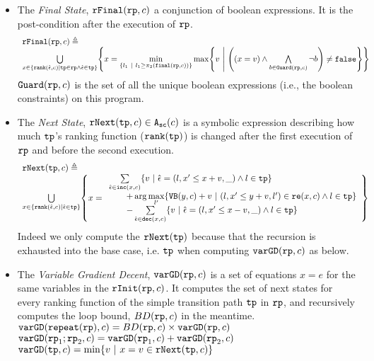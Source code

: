 \begin{defn}
\begin{itemize}
 \item  The \emph{Final State}, $\mathtt{rFinal}(\mathtt{rp}, c)$ a conjunction of boolean expressions.
 It is the post-condition
 after the execution of $\mathtt{rp}$.
 \[
  \begin{array}{l} 
    \rffinal(\rprog, c) \triangleq 
    \\
   \bigcup\limits_{x \in \left\{ \locbound(\absevent, c) | \tpath \in \rprog \land \absevent \in \tpath \right\} }
   \left \{ 
   x = \min\limits_{ \left\{ l_1 ~|~ l_1 \geq \pi_2(\absfinal(\rprog, c)) \right\} }
   \max\left\{
     v ~\middle\vert~ 
     \left( (x = v) \land \bigwedge\limits_{b \in \kw{Guard}(\rprog, c)} \neg b \right) \neq \efalse
   \right\}
   \right\}
  \end{array}
  \]
  $\mathtt{Guard}(\mathtt{rp}, c)$ is the set of all the unique boolean expressions (i.e., the boolean constraints) on this program.
 \item The \emph{Next State}, $\mathtt{rNext}(\mathtt{tp}, c) \in {\ensuremath{\mathtt{A_{sc}}}}(c)$ 
 is a
 symbolic expression describing how much $\mathtt{tp}$'s ranking function ($\mathtt{rank}(\mathtt{tp})$) is changed after the first execution of $\mathtt{rp}$ and before the second execution.
 \[
   \begin{array}{l}
   \rfnext(\tpath, c) \triangleq 
   \\
   \bigcup\limits_{x \in \left\{ \locbound(\absevent, c) | \absevent \in \tpath \right\}}
   \left\{ x = \begin{array}{l}
  \sum\limits_{\absevent \in \inc(x, c) }
   \left\{ v ~\middle\vert~ \absevent = (l, x' \leq x + v, \_) \land l \in \tpath\right\}
   \\ \qquad 
   + \arg\max\limits_{l' }
      \left\{ \varinvar(y, c) + v ~\middle\vert~ (l, x' \leq y + v, l') \in \reset(x, c) \land l \in \tpath\right\}
      \\ \qquad 
     - \sum\limits_{ \absevent \in \dec(x, c) }\left\{ 
       v ~\middle\vert~ \absevent = (l, x' \leq x - v, \_) \land l \in \tpath 
       \right\}
     \end{array}
   \right\} 
   \end{array}
 \]
 Indeed we only compute the $\mathtt{rNext}(\mathtt{tp})$ because that the recursion is exhausted into the base case, i.e. $\mathtt{tp}$ when computing $\mathtt{varGD}(\mathtt{rp}, c)$ as below.
 \item  The \emph{Variable Gradient Decent}, 
 $\mathtt{varGD}(\mathtt{rp}, c)$
 is a set of equations $x = e$ for the same variables in the $\mathtt{rInit}(\mathtt{rp}, c)$.
 It computes the set of next states for every ranking function of the simple transition path $\mathtt{tp}$ in $\mathtt{rp}$,
 and recursively computes the loop bound, $BD(\mathtt{rp}, c)$ in the meantime.
 \\
 {$\mathtt{varGD}(\mathtt{repeat}(\mathtt{rp}), c) =  BD(\mathtt{rp}, c)  \times
{\ensuremath{\mathtt{varGD}}(\ensuremath{\mathtt{rp}}, c)}$}
 \\
 $\mathtt{varGD}(\mathtt{rp}_1;\mathtt{rp}_2, c) =  \mathtt{varGD}(\mathtt{rp}_1, c) + \mathtt{varGD}(\mathtt{rp}_2, c)$
 \\
 $\varGD(\tpath, c) =  \min\left\{v  ~|~ x = v \in \rfnext(\tpath, c) \right\}  $  
\end{itemize}
\end{defn}
